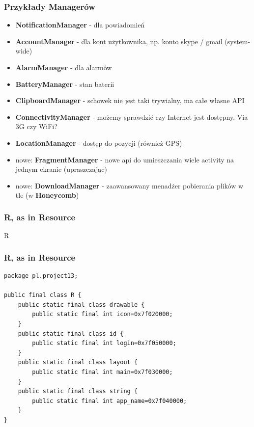 \documentclass{beamer}
\begin{document}
\begin{frame}
  \frametitle{Przykłady Managerów}
  \begin{itemize}
    \item \textbf{NotificationManager} - dla powiadomień
    \pause \item \textbf{AccountManager} - dla kont użytkownika, np. konto skype / gmail (system-wide)
    \pause \item \textbf{AlarmManager} - dla alarmów
    \pause \item \textbf{BatteryManager} - stan baterii
    \pause \item \textbf{ClipboardManager} - schowek nie jest taki trywialny, ma całe własne API
    \pause \item \textbf{ConnectivityManager} - możemy sprawdzić czy Internet jest dostępny. Via 3G czy WiFi?
    \pause \item \textbf{LocationManager} - dostęp do pozycji (również GPS)
    \pause \item nowe: \textbf{FragmentManager} - nowe api do umieszczania wiele activity na jednym ekranie (upraszczając)
    \pause \item nowe: \textbf{DownloadManager} - zaawansowany menadżer pobierania plików w tle (w \textbf{Honeycomb})
  \end{itemize}
\end{frame}

\begin{frame}
 \frametitle{R, as in Resource}  
\begin{center}
 \Huge{R}
\end{center}
\end{frame}

\begin{frame}[fragile]
\frametitle{R, as in Resource}
 \begin{lstlisting}
package pl.project13;

public final class R {
    public static final class drawable {
        public static final int icon=0x7f020000;
    }
    public static final class id {
        public static final int login=0x7f050000;
    }
    public static final class layout {
        public static final int main=0x7f030000;
    }
    public static final class string {
        public static final int app_name=0x7f040000;
    }
}
 \end{lstlisting}
\end{frame}
\end{document}

